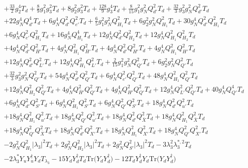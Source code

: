 {\begin{align}
 &+\frac{33}{2} g_{2}^{4} T_d +\frac{8}{9} g_{1}^{2} g_{3}^{2} T_d +8 g_{2}^{2} g_{3}^{2} T_d +\frac{128}{9} g_{3}^{4} T_d +\frac{8}{15} g_{1}^{2} g_{N}^{2} Q_{d'}^{2} T_d +\frac{32}{3} g_{3}^{2} g_{N}^{2} Q_{d'}^{2} T_d \nonumber \\ 
 &+22 g_{N}^{4} Q_{d'}^{4} T_d +6 g_{N}^{4} Q_{d'}^{2} Q_{e'}^{2} T_d +\frac{6}{5} g_{1}^{2} g_{N}^{2} Q_{H_1}^{2} T_d +6 g_{2}^{2} g_{N}^{2} Q_{H_1}^{2} T_d +30 g_{N}^{4} Q_{d'}^{2} Q_{H_1}^{2} T_d \nonumber \\ 
 &+6 g_{N}^{4} Q_{e'}^{2} Q_{H_1}^{2} T_d +16 g_{N}^{4} Q_{H_1}^{4} T_d +12 g_{N}^{4} Q_{d'}^{2} Q_{H_2}^{2} T_d +12 g_{N}^{4} Q_{H_1}^{2} Q_{H_2}^{2} T_d \nonumber \\ 
 &+4 g_{N}^{4} Q_{d'}^{2} Q_{\bar{H}'}^{2} T_d +4 g_{N}^{4} Q_{H_1}^{2} Q_{\bar{H}'}^{2} T_d +4 g_{N}^{4} Q_{d'}^{2} Q_{H'}^{2} T_d +4 g_{N}^{4} Q_{H_1}^{2} Q_{H'}^{2} T_d \nonumber \\ 
 &+12 g_{N}^{4} Q_{d'}^{2} Q_{L'}^{2} T_d +12 g_{N}^{4} Q_{H_1}^{2} Q_{L'}^{2} T_d +\frac{2}{15} g_{1}^{2} g_{N}^{2} Q_{Q'}^{2} T_d +6 g_{2}^{2} g_{N}^{2} Q_{Q'}^{2} T_d \nonumber \\ 
 &+\frac{32}{3} g_{3}^{2} g_{N}^{2} Q_{Q'}^{2} T_d +54 g_{N}^{4} Q_{d'}^{2} Q_{Q'}^{2} T_d +6 g_{N}^{4} Q_{e'}^{2} Q_{Q'}^{2} T_d +48 g_{N}^{4} Q_{H_1}^{2} Q_{Q'}^{2} T_d \nonumber \\ 
 &+12 g_{N}^{4} Q_{H_2}^{2} Q_{Q'}^{2} T_d +4 g_{N}^{4} Q_{\bar{H}'}^{2} Q_{Q'}^{2} T_d +4 g_{N}^{4} Q_{H'}^{2} Q_{Q'}^{2} T_d +12 g_{N}^{4} Q_{L'}^{2} Q_{Q'}^{2} T_d +40 g_{N}^{4} Q_{Q'}^{4} T_d \nonumber \\ 
 &+6 g_{N}^{4} Q_{d'}^{2} Q_{S'}^{2} T_d +6 g_{N}^{4} Q_{H_1}^{2} Q_{S'}^{2} T_d +6 g_{N}^{4} Q_{Q'}^{2} Q_{S'}^{2} T_d +18 g_{N}^{4} Q_{d'}^{2} Q_{u'}^{2} T_d \nonumber \\ 
 &+18 g_{N}^{4} Q_{H_1}^{2} Q_{u'}^{2} T_d +18 g_{N}^{4} Q_{Q'}^{2} Q_{u'}^{2} T_d +18 g_{N}^{4} Q_{d'}^{2} Q_{\bar{X}}^{2} T_d +18 g_{N}^{4} Q_{H_1}^{2} Q_{\bar{X}}^{2} T_d \nonumber \\ 
 &+18 g_{N}^{4} Q_{Q'}^{2} Q_{\bar{X}}^{2} T_d +18 g_{N}^{4} Q_{d'}^{2} Q_{X'}^{2} T_d +18 g_{N}^{4} Q_{H_1}^{2} Q_{X'}^{2} T_d +18 g_{N}^{4} Q_{Q'}^{2} Q_{X'}^{2} T_d \nonumber \\ 
 &-2 g_{N}^{2} Q_{H_1}^{2} |\lambda_3|^2 T_d +2 g_{N}^{2} Q_{H_2}^{2} |\lambda_3|^2 T_d +2 g_{N}^{2} Q_{S'}^{2} |\lambda_3|^2 T_d -3 \lambda_{3}^{2} \lambda_{3}^{*,2} T_d \nonumber \\ 
 &-2 \lambda_3^* {Y_u  Y_{u}^{\dagger}  Y_d} T_{\lambda_3} -15 {Y_d  Y_{d}^{\dagger}  T_d} \mbox{Tr}\Big({Y_d  Y_{d}^{\dagger}}\Big) -12 {T_d  Y_{d}^{\dagger}  Y_d} \mbox{Tr}\Big({Y_d  Y_{d}^{\dagger}}\Big) \nonumber \\ 

\end{align}}
